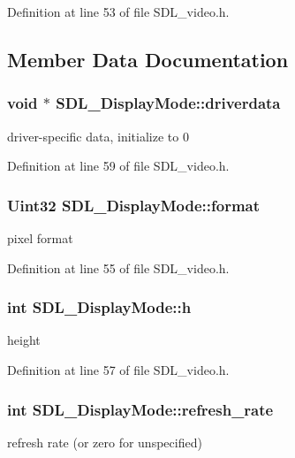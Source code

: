 Definition at line 53 of file S\+D\+L\+\_\+video.\+h.



\subsection{Member Data Documentation}
\hypertarget{structSDL__DisplayMode_abc8ae3922fa84e6411834c1a7877e36d}{
\subsubsection[{driverdata}]{\setlength{\rightskip}{0pt plus 5cm}void $\ast$ S\+D\+L\+\_\+\+Display\+Mode\+::driverdata}}\label{structSDL__DisplayMode_abc8ae3922fa84e6411834c1a7877e36d}
driver-\/specific data, initialize to 0 

Definition at line 59 of file S\+D\+L\+\_\+video.\+h.

\hypertarget{structSDL__DisplayMode_ae8120e0a18a99992f039756e1b503680}{
\subsubsection[{format}]{\setlength{\rightskip}{0pt plus 5cm}Uint32 S\+D\+L\+\_\+\+Display\+Mode\+::format}}\label{structSDL__DisplayMode_ae8120e0a18a99992f039756e1b503680}
pixel format 

Definition at line 55 of file S\+D\+L\+\_\+video.\+h.

\hypertarget{structSDL__DisplayMode_a0d9eabed50a560ed553af772c26632d7}{
\subsubsection[{h}]{\setlength{\rightskip}{0pt plus 5cm}int S\+D\+L\+\_\+\+Display\+Mode\+::h}}\label{structSDL__DisplayMode_a0d9eabed50a560ed553af772c26632d7}
height 

Definition at line 57 of file S\+D\+L\+\_\+video.\+h.

\hypertarget{structSDL__DisplayMode_ad1b5783c9b292ebf24ad4e0e7a98e540}{
\subsubsection[{refresh\+\_\+rate}]{\setlength{\rightskip}{0pt plus 5cm}int S\+D\+L\+\_\+\+Display\+Mode\+::refresh\+\_\+rate}}\label{structSDL__DisplayMode_ad1b5783c9b292ebf24ad4e0e7a98e540}
refresh rate (or zero for unspecified) 

